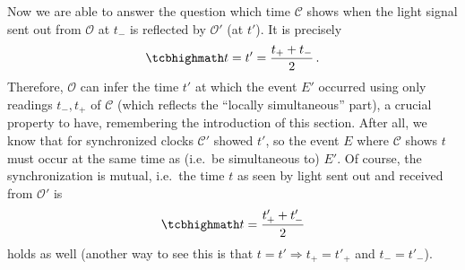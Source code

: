 \documentclass[../relativity_main.tex]{subfiles}
\begin{document}
Now we are able to answer the question which time $\mathcal{C}$ shows when the light signal sent out from $\mathcal{O}$ at $t_-$ is reflected by $\mathcal{O}'$ (at $t'$). It is precisely
\begin{equation}\label{eq:simult_explicit}
	\eqbox{
	t = t' = \frac{t_+ + t_-}{2}
	} \, .
\end{equation}
Therefore, $\mathcal{O}$ can infer the time $t'$ at which the event $E'$ occurred using only readings $t_-, t_+$ of $\mathcal{C}$ (which reflects the \enquote{locally simultaneous} part), a crucial property to have, remembering the introduction of this section. After all, we know that for synchronized clocks $\mathcal{C}'$ showed $t'$, so the event $E$ where $\mathcal{C}$ shows $t$ must occur at the same time as (i.e.~be simultaneous to) $E'$. Of course, the synchronization is mutual, i.e.~the time $t$ as seen by light sent out and received from $\mathcal{O}'$ is
\begin{equation}
	\eqbox{
	t = \frac{t'_+ + t'_-}{2}
	}
\end{equation}
holds as well (another way to see this is that $t = t' \Rightarrow t_+ = t'_+$ and $t_- = t'_-$).
\end{document}
